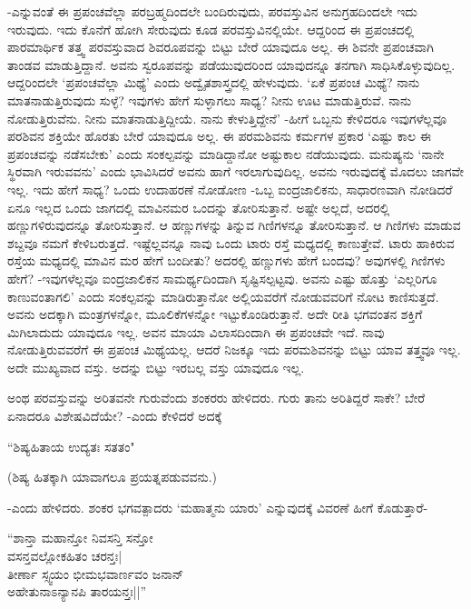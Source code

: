 -ಎನ್ನುವಂತೆ ಈ ಪ್ರಪಂಚವೆಲ್ಲಾ ಪರಬ್ರಹ್ಮದಿಂದಲೇ ಬಂದಿರುವುದು, ಪರವಸ್ತುವಿನ ಅನುಗ್ರಹದಿಂದಲೇ ಇದು ಇರುವುದು. ಇದು ಕೊನೆಗೆ ಹೋಗಿ ಸೇರುವುದು ಕೂಡ ಪರವಸ್ತುವಿನಲ್ಲಿಯೇ. ಆದ್ದರಿಂದ ಈ ಪ್ರಪಂಚದಲ್ಲಿ ಪಾರಮಾರ್ಥಿಕ ತತ್ತ್ವ ಪರವಸ್ತುವಾದ ಶಿವರೂಪವನ್ನು ಬಿಟ್ಟು ಬೇರೆ ಯಾವುದೂ ಅಲ್ಲ. ಈ ಶಿವನೇ ಪ್ರಪಂಚವಾಗಿ ತಾಂಡವ ಮಾಡುತ್ತಿದ್ದಾನೆ. ಅವನು ಸ್ವರೂಪವನ್ನು ಪಡೆಯುವುದರಿಂದ ಯಾವುದನ್ನೂ ತನಗಾಗಿ ಸಾಧಿಸಿಕೊಳ್ಳುವುದಿಲ್ಲ. ಆದ್ದರಿಂದಲೇ `ಪ್ರಪಂಚವೆಲ್ಲಾ ಮಿಥ್ಯೆ' ಎಂದು ಅದ್ವೈತಶಾಸ್ತ್ರದಲ್ಲಿ ಹೇಳುವುದು. `ಏಕೆ ಪ್ರಪಂಚ ಮಿಥ್ಯೆ? ನಾನು ಮಾತನಾಡುತ್ತಿರುವುದು ಸುಳ್ಳೆ? ಇವುಗಳು ಹೇಗೆ ಸುಳ್ಳಾಗಲು ಸಾಧ್ಯ? ನೀನು ಊಟ ಮಾಡುತ್ತಿರುವೆ. ನಾನು ನೋಡುತ್ತಿರುವೆನು. ನೀನು ಮಾತನಾಡುತ್ತಿದ್ದೀಯೆ. ನಾನು ಕೇಳುತ್ತಿದ್ದೇನೆ' -ಹೀಗೆ ಒಬ್ಬನು ಕೇಳಿದರೂ ಇವುಗಳೆಲ್ಲವೂ ಪರಶಿವನ ಶಕ್ತಿಯೇ ಹೊರತು ಬೇರೆ ಯಾವುದೂ ಅಲ್ಲ. ಈ ಪರಮಶಿವನು ಕರ್ಮಗಳ ಪ್ರಕಾರ `ಎಷ್ಟು ಕಾಲ ಈ ಪ್ರಪಂಚವನ್ನು ನಡೆಸಬೇಕು' ಎಂದು ಸಂಕಲ್ಪವನ್ನು ಮಾಡಿದ್ದಾನೋ ಅಷ್ಟುಕಾಲ ನಡೆಯುವುದು. ಮನುಷ್ಯನು `ನಾನೇ ಸ್ಥಿರವಾಗಿ ಇರುವವನು' ಎಂದು ಭಾವಿಸಿದರೆ ಅವನು ಹಾಗೆ ಇರಲಾಗುವುದಿಲ್ಲ. ಅವನು ಇರುವುದಕ್ಕೆ ಮೊದಲು ಜಾಗವೇ ಇಲ್ಲ. ಇದು ಹೇಗೆ ಸಾಧ್ಯ? ಒಂದು ಉದಾಹರಣೆ ನೋಡೋಣ -ಒಬ್ಬ ಐಂದ್ರಜಾಲಿಕನು, ಸಾಧಾರಣವಾಗಿ ನೋಡಿದರೆ ಏನೂ ಇಲ್ಲದ ಒಂದು ಜಾಗದಲ್ಲಿ ಮಾವಿನಮರ ಒಂದನ್ನು ತೋರಿಸುತ್ತಾನೆ. ಅಷ್ಟೇ ಅಲ್ಲದೆ, ಅದರಲ್ಲಿ ಹಣ್ಣುಗಳಿರುವುದನ್ನೂ ತೋರಿಸುತ್ತಾನೆ. ಆ ಹಣ್ಣುಗಳನ್ನು ತಿನ್ನುವ ಗಿಣಿಗಳನ್ನೂ ತೋರಿಸುತ್ತಾನೆ. ಆ ಗಿಣಿಗಳು ಮಾಡುವ ಶಬ್ದವೂ ನಮಗೆ ಕೇಳಿಬರುತ್ತದೆ. ಇಷ್ಟೆಲ್ಲವನ್ನೂ ನಾವು ಒಂದು ಟಾರು ರಸ್ತೆ ಮಧ್ಯದಲ್ಲಿ ಕಾಣುತ್ತೇವೆ. ಟಾರು ಹಾಕಿರುವ ರಸ್ತೆಯ ಮಧ್ಯದಲ್ಲಿ ಮಾವಿನ ಮರ ಹೇಗೆ ಬಂದೀತು? ಅದರಲ್ಲಿ ಹಣ್ಣುಗಳು ಹೇಗೆ ಬಂದವು?  ಅವುಗಳಲ್ಲಿ ಗಿಣಿಗಳು ಹೇಗೆ? -ಇವುಗಳೆಲ್ಲವೂ ಐಂದ್ರಜಾಲಿಕನ ಸಾಮರ್ಥ್ಯದಿಂದಾಗಿ ಸೃಷ್ಟಿಸಲ್ಪಟ್ಟವು. ಅವನು ಎಷ್ಟು ಹೊತ್ತು `ಎಲ್ಲರಿಗೂ ಕಾಣುವಂತಾಗಲಿ' ಎಂದು ಸಂಕಲ್ಪವನ್ನು ಮಾಡಿರುತ್ತಾನೋ ಅಲ್ಲಿಯವರೆಗೆ ನೋಡುವವರಿಗೆ ನೋಟ ಕಾಣಿಸುತ್ತದೆ. ಅವನು ಅದಕ್ಕಾಗಿ ಮಂತ್ರಗಳನ್ನೋ, ಮೂಲಿಕೆಗಳನ್ನೋ ಇಟ್ಟುಕೊಂಡಿರುತ್ತಾನೆ. ಅದೇ ರೀತಿ ಭಗವಂತನ ಶಕ್ತಿಗೆ ಮಿಗಿಲಾದುದು ಯಾವುದೂ ಇಲ್ಲ. ಅವನ ಮಾಯಾ ವಿಲಾಸದಿಂದಾಗಿ ಈ ಪ್ರಪಂಚವೇ ಇದೆ. ನಾವು ನೋಡುತ್ತಿರುವವರೆಗೆ ಈ ಪ್ರಪಂಚ ಮಿಥ್ಯೆಯಲ್ಲ. ಆದರೆ ನಿಜಕ್ಕೂ ಇದು ಪರಮಶಿವನನ್ನು ಬಿಟ್ಟು ಯಾವ ತತ್ತ್ವವೂ ಇಲ್ಲ. ಅದೇ ಮುಖ್ಯವಾದ ವಸ್ತು. ಅದನ್ನು ಬಿಟ್ಟು ಇರಬಲ್ಲ ವಸ್ತು ಯಾವುದೂ ಇಲ್ಲ. 

ಅಂಥ ಪರವಸ್ತುವನ್ನು ಅರಿತವನೇ ಗುರುವೆಂದು ಶಂಕರರು ಹೇಳಿದರು. ಗುರು ತಾನು ಅರಿತಿದ್ದರೆ ಸಾಕೇ? ಬೇರೆ ಏನಾದರೂ ವಿಶೇಷವಿದೆಯೇ? -ಎಂದು ಕೇಳಿದರೆ ಅದಕ್ಕೆ 

\begin{shloka}
``ಶಿಷ್ಯಹಿತಾಯ ಉದ್ಯತಃ ಸತತಂ"
\end{shloka}

(ಶಿಷ್ಯ ಹಿತಕ್ಕಾಗಿ ಯಾವಾಗಲೂ ಪ್ರಯತ್ನಪಡುವವನು.)

-ಎಂದು ಹೇಳಿದರು. ಶಂಕರ ಭಗವತ್ಪಾದರು `ಮಹಾತ್ಮನು ಯಾರು' ಎನ್ನುವುದಕ್ಕೆ ವಿವರಣೆ ಹೀಗೆ ಕೊಡುತ್ತಾರೆ-

\begin{shloka}
``ಶಾನ್ತಾ ಮಹಾನ್ತೋ ನಿವಸನ್ತಿ ಸನ್ತೋ\\
ವಸನ್ತವಲ್ಲೋಕಹಿತಂ ಚರನ್ತಃ|\\
ತೀರ್ಣಾ ಸ್ಸ್ವಯಂ ಭೀಮಭವಾರ್ಣವಂ ಜನಾನ್\\
ಅಹೇತುನಾಽನ್ಯಾನಪಿ ತಾರಯನ್ತಃ||''
\end{shloka}

